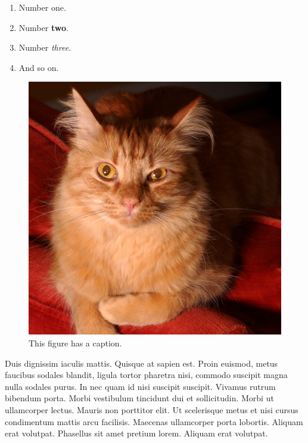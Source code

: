 \documentclass[letterpaper,11pt,twocolumn]{article}
\begin{document}
\begin{enumerate}
  \item{Number one.}
  \item{Number \textbf{two}.}
  \item{Number \emph{three}.}
  \item{And so on.}
\end{enumerate}

\begin{figure}
\begin{center}
\includegraphics[width=5in]{fritz}
\caption{This figure has a caption.}
\label{fig:f1}
\end{center}
\end{figure}

Duis dignissim iaculis mattis. Quisque at sapien est. Proin euismod, metus faucibus sodales blandit, ligula tortor pharetra nisi, commodo suscipit magna nulla sodales purus. In nec quam id nisi suscipit suscipit. Vivamus rutrum bibendum porta. Morbi vestibulum tincidunt dui et sollicitudin. Morbi ut ullamcorper lectus. Mauris non porttitor elit. Ut scelerisque metus et nisi cursus condimentum mattis arcu facilisis. Maecenas ullamcorper porta lobortis. Aliquam erat volutpat. Phasellus sit amet pretium lorem. Aliquam erat volutpat.
\end{document}
